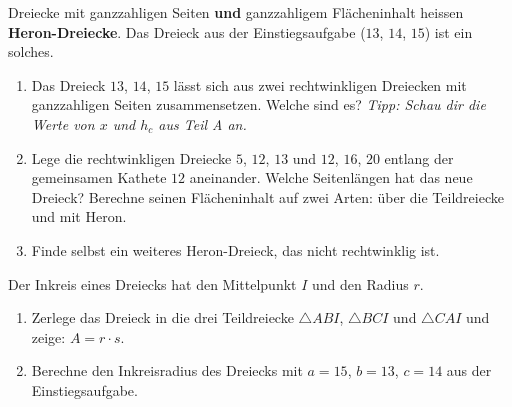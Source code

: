 \documentclass[11pt,oneside]{article}
\begin{document}
\begin{aufgabe}
	Dreiecke mit ganzzahligen Seiten \textbf{und} ganzzahligem Flächeninhalt heissen \textbf{Heron-Dreiecke}. Das Dreieck aus der Einstiegsaufgabe ($13$, $14$, $15$) ist ein solches.
	\begin{enumerate}[label=\alph*)]
		\item Das Dreieck $13$, $14$, $15$ lässt sich aus zwei rechtwinkligen Dreiecken mit ganzzahligen Seiten zusammensetzen. Welche sind es? \textit{Tipp: Schau dir die Werte von $x$ und $h_c$ aus Teil A an.}
		\item Lege die rechtwinkligen Dreiecke $5$, $12$, $13$ und $12$, $16$, $20$ entlang der gemeinsamen Kathete $12$ aneinander. Welche Seitenlängen hat das neue Dreieck? Berechne seinen Flächeninhalt auf zwei Arten: über die Teildreiecke und mit Heron.
		\item Finde selbst ein weiteres Heron-Dreieck, das nicht rechtwinklig ist.
	\end{enumerate}
\end{aufgabe}

\begin{aufgabe}
	Der Inkreis eines Dreiecks hat den Mittelpunkt $I$ und den Radius $r$.
	\begin{enumerate}[label=\alph*)]
		\item Zerlege das Dreieck in die drei Teildreiecke $\triangle ABI$, $\triangle BCI$ und $\triangle CAI$ und zeige: $A=r\cdot s$.
		\item Berechne den Inkreisradius des Dreiecks mit $a=15$, $b=13$, $c=14$ aus der Einstiegsaufgabe.
	\end{enumerate}
\end{aufgabe}
\end{document}
